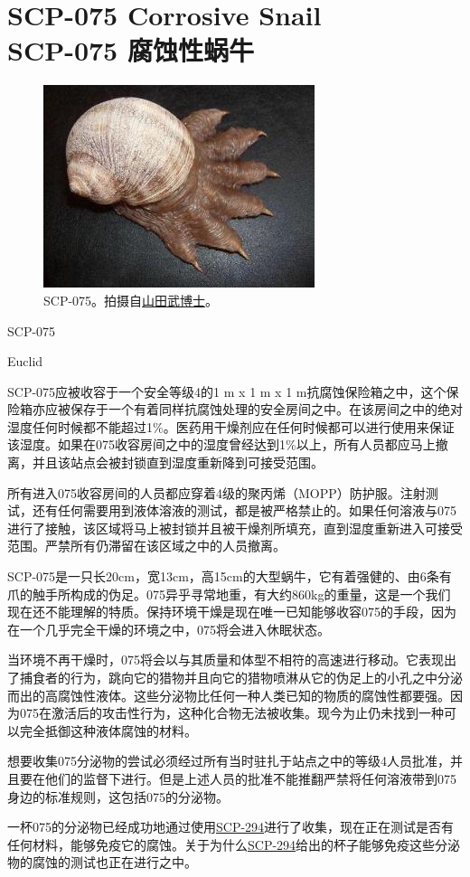 \chapter[SCP-075 腐蚀性蜗牛]{
    SCP-075 Corrosive Snail\\
    SCP-075 腐蚀性蜗牛
}

\label{chap:SCP-075}

\begin{figure}[H]
    \centering
    \includegraphics[width=0.5\linewidth]{images/SCP.075.jpg}
    \caption*{SCP-075。拍摄自\hyperref[chap:]{山田武博士}。}
\end{figure}

SCP-075

Euclid

SCP-075应被收容于一个安全等级4的1 m x 1 m x 1 m抗腐蚀保险箱之中，这个保险箱亦应被保存于一个有着同样抗腐蚀处理的安全房间之中。在该房间之中的绝对湿度任何时候都不能超过1\%。医药用干燥剂应在任何时候都可以进行使用来保证该湿度。如果在075收容房间之中的湿度曾经达到1\%以上，所有人员都应马上撤离，并且该站点会被封锁直到湿度重新降到可接受范围。

所有进入075收容房间的人员都应穿着4级的聚丙烯（MOPP）防护服。注射测试，还有任何需要用到液体溶液的测试，都是被严格禁止的。如果任何溶液与075进行了接触，该区域将马上被封锁并且被干燥剂所填充，直到湿度重新进入可接受范围。严禁所有仍滞留在该区域之中的人员撤离。

SCP-075是一只长20cm，宽13cm，高15cm的大型蜗牛，它有着强健的、由6条有爪的触手所构成的伪足。075异乎寻常地重，有大约860kg的重量，这是一个我们现在还不能理解的特质。保持环境干燥是现在唯一已知能够收容075的手段，因为在一个几乎完全干燥的环境之中，075将会进入休眠状态。

当环境不再干燥时，075将会以与其质量和体型不相符的高速进行移动。它表现出了捕食者的行为，跳向它的猎物并且向它的猎物喷淋从它的伪足上的小孔之中分泌而出的高腐蚀性液体。这些分泌物比任何一种人类已知的物质的腐蚀性都要强。因为075在激活后的攻击性行为，这种化合物无法被收集。现今为止仍未找到一种可以完全抵御这种液体腐蚀的材料。

想要收集075分泌物的尝试必须经过所有当时驻扎于站点之中的等级4人员批准，并且要在他们的监督下进行。但是上述人员的批准不能推翻严禁将任何溶液带到075身边的标准规则，这包括075的分泌物。

一杯075的分泌物已经成功地通过使用\hyperref[chap:SCP-294]{SCP-294}进行了收集，现在正在测试是否有任何材料，能够免疫它的腐蚀。关于为什么\hyperref[chap:SCP-294]{SCP-294}给出的杯子能够免疫这些分泌物的腐蚀的测试也正在进行之中。
